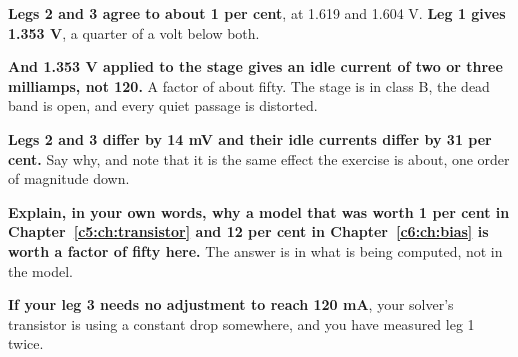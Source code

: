 \textbf{Legs 2 and 3 agree to about 1 per cent}, at 1.619 and 1.604 V. \textbf{Leg 1 gives 1.353 V}, a quarter of a volt below both.

\textbf{And 1.353 V applied to the stage gives an idle current of two or three milliamps, not 120.} A factor of about fifty. The stage is in class B, the dead band is open, and every quiet passage is distorted.

\textbf{Legs 2 and 3 differ by 14 mV and their idle currents differ by 31 per cent.} Say why, and note that it is the same effect the exercise is about, one order of magnitude down.

\textbf{Explain, in your own words, why a model that was worth 1 per cent in Chapter~\ref{c5:ch:transistor} and 12 per cent in Chapter~\ref{c6:ch:bias} is worth a factor of fifty here.} The answer is in what is being computed, not in the model.

\textbf{If your leg 3 needs no adjustment to reach 120 mA}, your solver's transistor is using a constant drop somewhere, and you have measured leg 1 twice.
